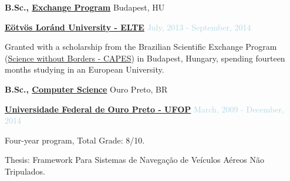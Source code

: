 \medskip

\textbf{B.Sc., 
        \href{https://www.elte.hu}
             {Exchange Program}} \hfill Budapest, HU

\begin{outerlist}

\item[] \href{https://www.elte.hu}{\textbf{Eötvös Loránd University - ELTE}} \hfill {\textcolor{lightblue}{July, 2013 - September, 2014}} \medskip
        \begin{innerlist}[-]
        \item Granted with a scholarship from the Brazilian Scientific Exchange Program (\href{http://capes.gov.br/images/stories/download/diversos/folder-SWB.pdf}{Science without Borders - CAPES}) in Budapest, Hungary, spending fourteen months studying in an European University.
        \end{innerlist}

\end{outerlist}

\textbf{B.Sc., 
        \href{https://ufop.br}
             {Computer Science}} \hfill Ouro Preto, BR

\begin{outerlist}

\item[] \href{https://ufop.br}{\textbf{Universidade Federal de Ouro Preto - UFOP}} \hfill {\textcolor{lightblue}{March, 2009 - December, 2014}} \medskip
        \begin{innerlist}[-]
        \item Four-year program, Total Grade: 8/10.
        \item Thesis: Framework Para Sistemas de Navegação de Veículos Aéreos Não Tripulados.
        \end{innerlist}

\end{outerlist}

